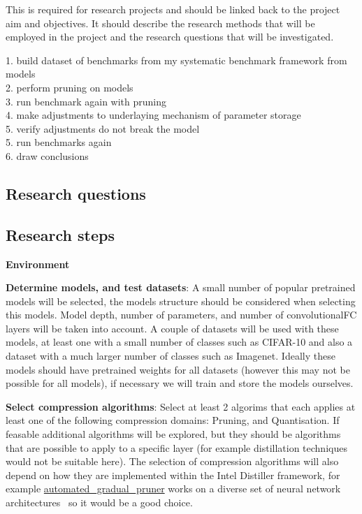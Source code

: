 \documentclass[../../D1.tex]{subfiles}
\begin{document}
This is required for research projects and should be linked
back to the project aim and objectives. It should describe the research methods that
will be employed in the project and the research questions that will be investigated.

1. build dataset of benchmarks from my systematic benchmark framework from models\\
2. perform pruning on models\\
3. run benchmark again with pruning\\
4. make adjustments to underlaying mechanism of parameter storage\\
5. verify adjustments do not break the model\\
5. run benchmarks again\\
6. draw conclusions\\


\subsection{Research questions}


\subsection{Research steps}

\textbf{Environment}

\textbf{Determine models, and test datasets}: A small number of popular pretrained models will be selected, the models structure should be considered when selecting this models. Model depth, number of parameters, and number of convolutional\/FC layers will be taken into account. A couple of datasets will be used with these models, at least one with a small number of classes such as CIFAR-10 and also a dataset with a much larger number of classes such as Imagenet. Ideally these models should have pretrained weights for all datasets (however this may not be possible for all models), if necessary we will train and store the models ourselves.

\textbf{Select compression algorithms}: Select at least 2 algorims that each applies at least one of the following compression domains: Pruning, and Quantisation. If feasable additional algorithms will be explored, but they should be algorithms that are possible to apply to a specific layer (for example distillation techniques would not be suitable here).
The selection of compression algorithms will also depend on how they are implemented within the Intel Distiller framework, for example \href{https://github.com/IntelLabs/distiller/blob/master/distiller/pruning/automated_gradual_pruner.py}{automated\_gradual\_pruner} works on a diverse set of neural network architectures~\autocite{zhuPruneNotPrune2017} so it would be a good choice.
\end{document}
